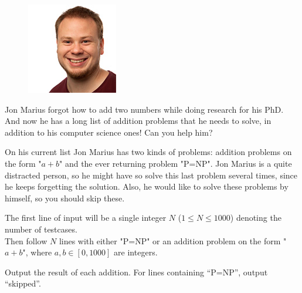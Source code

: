 
\begin{figure}
\vspace{-5mm}
\includegraphics[width=\linewidth,keepaspectratio=true]{add-help/venstad}
\vspace{-9mm}
\end{figure}

\noindent
Jon Marius forgot how to add two numbers while doing research for his PhD. And now he has a long list of addition problems that he needs to solve, in addition to his computer science ones! Can you help him?

On his current list Jon Marius has two kinds of problems: addition problems on the form "$a + b$" and the ever returning problem "P=NP". Jon Marius is a quite distracted person, so he might have so solve this last problem several times, since he keeps forgetting the solution. Also, he would like to solve these problems by himself, so you should skip these. 

\Input
The first line of input will be a single integer $N$ ($1 \leq N \leq 1000$) denoting the number of testcases.\\
Then follow $N$ lines with either "P=NP" or an addition problem on the form "$a+b$", where $a, b \in [0, 1000]$ are integers. 

\Output
Output the result of each addition. For lines containing ``P=NP'', output ``skipped''.



